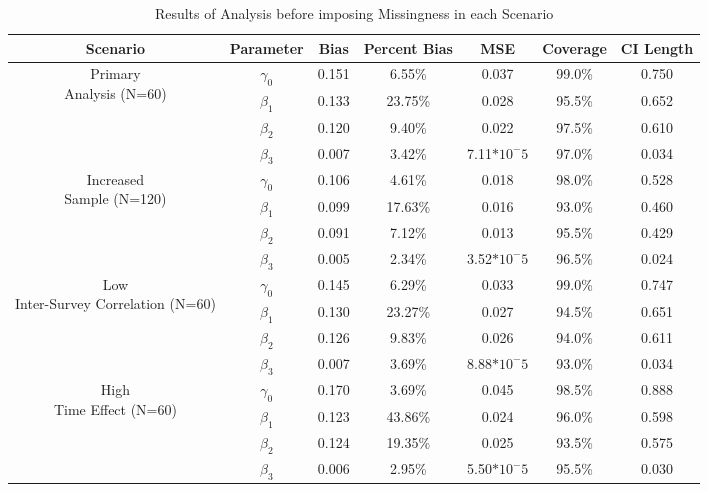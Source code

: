 \documentclass{svjour3}                     %
\begin{document}
\begin{table}[b!]
	\centering
	\caption{Results of Analysis before imposing Missingness in each Scenario}
	\setlength{\tabcolsep}{0.1cm}
	\label{tab:table2}
	\begin{tabular}{cc|ccccc}
		\toprule
		Scenario & Parameter & Bias & Percent Bias & MSE & Coverage & CI Length \\
		\midrule
		\multirow{4}{*}{\parbox{2cm}{Primary \\ Analysis (N=60)}} 
		& $\gamma_0$ & 0.151 & 6.55\% & 0.037 & 99.0\% & 0.750 \\
		& $\beta_1$ & 0.133 & 23.75\% & 0.028 & 95.5\% & 0.652 \\
		& $\beta_2$ & 0.120 & 9.40\% & 0.022 & 97.5\% & 0.610 \\
		& $\beta_3$ & 0.007 & 3.42\% & 7.11$*10^-5$ & 97.0\% & 0.034 \\
		\midrule
		\midrule
		\multirow{4}{*}{\parbox{2cm}{Increased \\ Sample (N=120)}} 
		& $\gamma_0$ & 0.106 & 4.61\% & 0.018 & 98.0\% & 0.528 \\
		& $\beta_1$ & 0.099 & 17.63\% & 0.016 & 93.0\% & 0.460 \\
		& $\beta_2$ & 0.091 & 7.12\% & 0.013 & 95.5\% & 0.429 \\
		& $\beta_3$ & 0.005 & 2.34\% & 3.52$*10^-5$ & 96.5\% & 0.024 \\
		\midrule
		\midrule
		\multirow{4}{*}{\parbox{2cm}{Low \\Inter-Survey Correlation (N=60)}} 
		& $\gamma_0$ & 0.145 & 6.29\% & 0.033 & 99.0\% & 0.747 \\
		& $\beta_1$ & 0.130 & 23.27\% & 0.027 & 94.5\% & 0.651 \\
		& $\beta_2$ & 0.126 & 9.83\% & 0.026 & 94.0\% & 0.611 \\
		& $\beta_3$ & 0.007 & 3.69\% & 8.88$*10^-5$ & 93.0\% & 0.034 \\
		\midrule
		\midrule
		\multirow{4}{*}{\parbox{2cm}{High \\Time Effect (N=60)}}
		& $\gamma_0$ & 0.170 & 3.69\% & 0.045 & 98.5\% & 0.888 \\
		& $\beta_1$ & 0.123 & 43.86\% & 0.024 & 96.0\% & 0.598 \\
		& $\beta_2$ & 0.124 & 19.35\% & 0.025 & 93.5\% & 0.575 \\
		& $\beta_3$ & 0.006 & 2.95\% & 5.50$*10^-5$ & 95.5\% & 0.030 \\
		\bottomrule
	\end{tabular}
\end{table}
\end{document}
